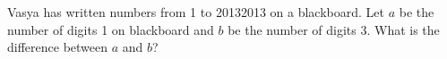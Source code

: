 \problem
Vasya has written numbers from 1 to 20132013 on a blackboard.
Let $a$ be the number of digits 1 on blackboard and $b$ be the number of digits
3.
What is the difference between $a$ and $b$?

\solution

\endproblem
